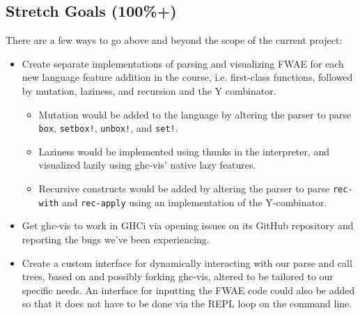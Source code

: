 \documentclass[format=acmlarge, review=false, nonacm=false, screen=true]{acmart}
\begin{document}
\subsection{Stretch Goals (100\%+)}
There are a few ways to go above and beyond the scope of the current project:
\begin{itemize}
    \item Create separate implementations of parsing and visualizing FWAE for each new language feature addition in the course, i.e. first-class functions, followed by mutation, laziness, and recursion and the Y combinator.
        \begin{itemize}
            \item Mutation would be added to the language by altering the parser to parse \texttt{box}, \texttt{setbox!}, \texttt{unbox!}, and \texttt{set!}.
            \item Laziness would be implemented using thunks in the interpreter, and visualized lazily using ghc-vis' native lazy features.
            \item Recursive constructs would be added by altering the parser to parse \texttt{rec-with} and \texttt{rec-apply} using an implementation of the Y-combinator.
        \end{itemize}
    \item Get ghc-vis to work in GHCi via opening issues on its GitHub repository and reporting the bugs we've been experiencing.
    \item Create a custom interface for dynamically interacting with our parse and call trees, based on and possibly forking ghc-vis, altered to be tailored to our specific needs. An interface for inputting the FWAE code could also be added so that it does not have to be done via the REPL loop on the command line.
\end{itemize}
\end{document}
